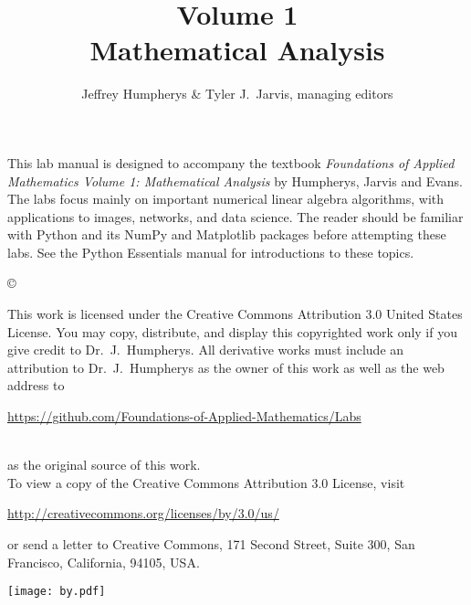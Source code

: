 \documentclass[opener-c,labs,blue,nociteref]{HJnewsiambook}
\title{Volume 1\\ Mathematical Analysis}
\author{Jeffrey Humpherys \& Tyler J.~Jarvis, managing editors}
\begin{document}

\newif\ifbyu
\byutrue
\byufalse %

\thispagestyle{empty} %
\maketitle
\thispagestyle{empty}
\frontmatter



\begin{thepreface} %

This lab manual is designed to accompany the textbook \emph{Foundations of Applied Mathematics Volume 1: Mathematical Analysis} by Humpherys, Jarvis and Evans.
The labs focus mainly on important numerical linear algebra algorithms, with applications to images, networks, and data science.
The reader should be familiar with Python \cite{vanrossum2010python} and its NumPy \cite{oliphant2006guide,ascher2001numerical,oliphant2007python} and Matplotlib \cite{Hunter:2007} packages before attempting these labs.
See the Python Essentials manual for introductions to these topics.

\vfill
\copyright{This work is licensed under the Creative Commons Attribution 3.0 United States License.
You may copy, distribute, and display this copyrighted work only if you give credit to Dr.~J.~Humpherys.
All derivative works must include an attribution to Dr.~J.~Humpherys as the owner of this work as well as the web address to
\\
\centerline{\url{https://github.com/Foundations-of-Applied-Mathematics/Labs}}
\\
as the original source of this work.
\\
To view a copy of the Creative Commons Attribution 3.0 License, visit
\\
\centerline{\url{http://creativecommons.org/licenses/by/3.0/us/}}
or send a letter to Creative Commons, 171 Second Street, Suite 300, San Francisco, California, 94105, USA.}

\vfill
\centering\texttt{[image: by.pdf]}
\vfill
\end{thepreface}

\setcounter{tocdepth}{1}
\tableofcontents

\mainmatter %
\end{document}
